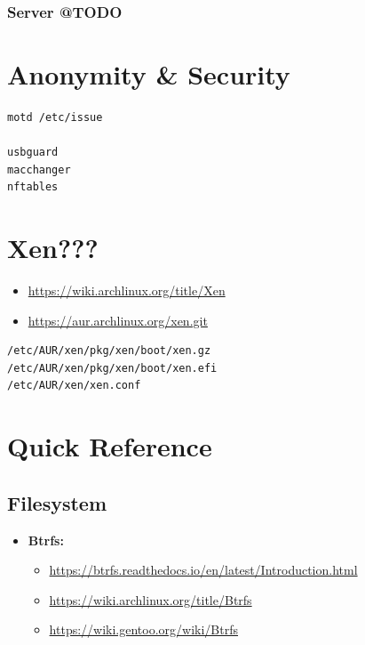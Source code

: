 \documentclass[10pt, a4paper, onecolumn, oneside, titlepage, openany]{book}
\begin{document}
\subsection{Server @TODO}


\chapter{Anonymity \& Security}
\begin{Verbatim}[commandchars=\\\{\}]
motd /etc/issue

usbguard
macchanger
nftables

\end{Verbatim}




\chapter{Xen???}
\begin{itemize}
    \item \url{https://wiki.archlinux.org/title/Xen}
    \item \url{https://aur.archlinux.org/xen.git}
\end{itemize}
\begin{Verbatim}[commandchars=\\\{\}]
/etc/AUR/xen/pkg/xen/boot/xen.gz
/etc/AUR/xen/pkg/xen/boot/xen.efi
/etc/AUR/xen/xen.conf
\end{Verbatim}        



\chapter{Quick Reference}
\section{Filesystem}
\begin{itemize}
    \item \textbf{Btrfs:}
    \begin{itemize}
        \item \url{https://btrfs.readthedocs.io/en/latest/Introduction.html}
        \item \url{https://wiki.archlinux.org/title/Btrfs}
        \item \url{https://wiki.gentoo.org/wiki/Btrfs}
    \end{itemize}
\end{itemize}
\end{document}
